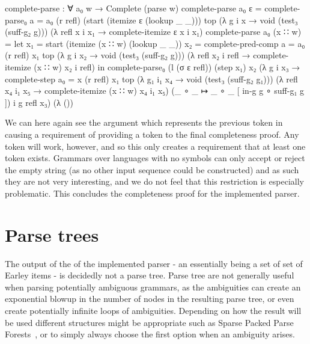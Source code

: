 		\begin{code}
			complete-parse : ∀ a₀ w →
			  Complete (parse w)
			complete-parse a₀ ε =
			  complete-parse₀ {a = a₀} (r refl) (start (itemize ε (lookup _ _))) top
			    (λ {g i x → void (test₃ (suff-g₂ g))})
			    (λ {refl x i x₁ → complete-itemize ε x i x₁})
			complete-parse a₀ (x ∷ w) =
			  let
			    x₁ = start (itemize (x ∷ w) (lookup _ _))
			    x₂ = complete-pred-comp {a = a₀} (r refl) x₁ top
			      (λ {g i x₂ → void (test₃ (suff-g₂ g))})
			      (λ {refl x₂ i refl → complete-itemize (x ∷ w) x₂ i refl})
			  in
			  complete-parse₀ (l (σ ε refl)) (step x₁) x₂
			    (λ g i x₃ → complete-step {a₀ = x} (r refl) x₁ top
			      (λ {g₁ i₁ x₄ → void (test₃ (suff-g₂ g₁))})
			      (λ {refl x₄ i₁ x₅ → complete-itemize (x ∷ w) x₄ i₁ x₅})
			      (_ ∘ _ ↦ _ ∘ _ [ in-g g ∘ suff-g₁ g ]) i g refl x₃)
			    (λ ())
		\end{code}

		We can here again see the argument  which represents the
		previous token in  causing a requirement of
		providing a token to the final completeness proof. Any token will work,
		however, and so this only creates a requirement that at least one token
		exists. Grammars over languages with no symbols can only accept or
		reject the empty string (as no other input sequence could be
		constructed) and as such they are not very interesting, and we do not
		feel that this restriction is especially problematic. This concludes
		the completeness proof for the implemented parser.

	\section{Parse trees}

		The output of the of the implemented parser - an 
		essentially being a set of set of Earley items - is decidedly not a
		parse tree.  Parse tree are not generally useful when parsing
		potentially ambiguous grammars, as the ambiguities can create an
		exponential blowup in the number of nodes in the resulting parse tree,
		or even create potentially infinite loops of ambiguities. Depending on
		how the result will be used different structures might be appropriate
		such as Sparse Packed Parse Forests~\cite{?}, or to simply always
		choose the first option when an ambiguity arises.
